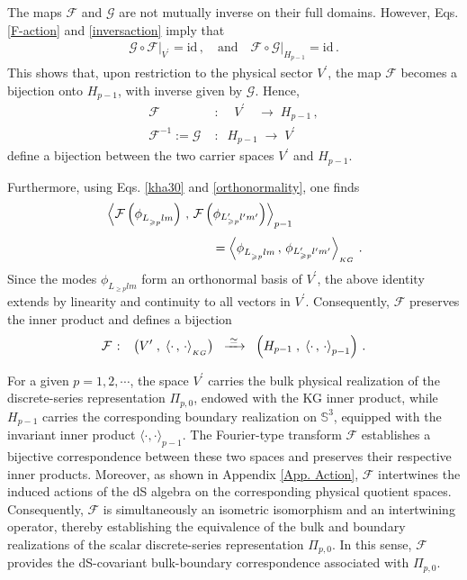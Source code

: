 \documentclass[aps,twocolumn,nofootinbib]{revtex4}
\begin{document}
{The maps $\mathcal{F}$ and $\mathcal{G}$ are not mutually inverse on their full domains. However, Eqs. \eqref{F-action} and \eqref{inversaction} imply that
\begin{align}
    \mathcal{G}\circ\mathcal{F} \Big|_{V^\prime} = \mathrm{id}\,, \quad\mbox{and}\quad \mathcal{F}\circ\mathcal{G} \Big|_{H_{p-1}} = \mathrm{id} \,.
\end{align}
This shows that, upon restriction to the physical sector $V^\prime$, the map $\mathcal F$ becomes a bijection onto $H_{p-1}$, with inverse given by $\mathcal G$. Hence,
\begin{align}
    \mathcal{F} &\;\colon\;\; \;\;V^\prime \quad\longrightarrow\; H_{p-1} \,, \nonumber\\[3pt]
    \mathcal{F}^{-1} :=\mathcal{G} &\;\colon\;\; H_{p-1} \;\longrightarrow\; V^\prime 
\end{align}
define a bijection between the two carrier spaces $V^\prime$ and $H_{p-1}$.

Furthermore, using Eqs. \eqref{kha30} and \eqref{orthonormality}, one finds
\begin{align}
    &\left\langle \mathcal{F}\left(\phi^{}_{L^{}_{\geqslant p}lm}\right) \,,\, \mathcal{F}\left(\phi_{L^\prime_{\geqslant p} l^\prime m^\prime}\right)\right\rangle_{p-1}
    \nonumber\\[3pt]
    &\hspace{3cm}= \left\langle\phi^{}_{L^{}_{\geqslant p}lm} \,,\, \phi_{L^\prime_{\geqslant p} l^\prime m^\prime}\right\rangle_{\vphantom{}_{KG}}\,.
\end{align}
Since the modes $\phi^{}_{L^{}_{\geqslant p}lm}$ form an orthonormal basis of $V^\prime$, the above identity extends by linearity and continuity to all vectors in $V^\prime$. Consequently, $\mathcal{F}$ preserves the inner product and defines a bijection
\begin{align}\label{Fourier}
    \mathcal{F} \;\colon\;\; \left(V^\prime \;,\;\left\langle\cdot\,,\,\cdot\right\rangle_{\vphantom{}_{KG}} \right) \;\;\xrightarrow{\;\simeq\;}\;\; \left(H_{p-1} \;,\;\left\langle\cdot \,,\,\cdot\right\rangle_{p-1} \right)\,.
\end{align}

For a given $p=1,2,\cdots$, the space $V^\prime$ carries the bulk physical realization of the discrete-series representation $\Pi_{p,0}$, endowed with the KG inner product, while $H_{p-1}$ carries the corresponding boundary realization on $\mathbb{S}^{3}$, equipped with the invariant inner product $\langle\cdot,\cdot\rangle_{p-1}$. The Fourier-type transform $\mathcal{F}$ establishes a bijective correspondence between these two spaces and preserves their respective inner products. Moreover, as shown in Appendix \ref{App. Action}, $\mathcal{F}$ intertwines the induced actions of the dS algebra on the corresponding physical quotient spaces. Consequently, $\mathcal{F}$ is simultaneously an isometric isomorphism and an intertwining operator, thereby establishing the equivalence of the bulk and boundary realizations of the scalar discrete-series representation $\Pi_{p,0}$. In this sense, $\mathcal{F}$ provides the dS-covariant bulk-boundary correspondence associated with $\Pi_{p,0}$.


}
\end{document}

